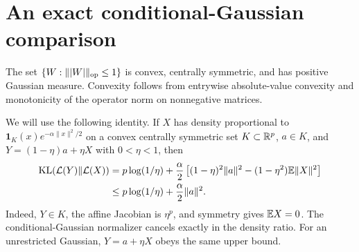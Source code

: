 \section{An exact conditional-Gaussian comparison}
The set $\{W:\||W|\|_{\mathrm{op}}\le1\}$ is convex, centrally symmetric, and has positive Gaussian measure. Convexity follows from entrywise absolute-value convexity and monotonicity of the operator norm on nonnegative matrices.

We will use the following identity. If $X$ has density proportional to $\mathbf1_K(x)e^{-\alpha\|x\|^2/2}$ on a convex centrally symmetric set $K\subset\mathbb R^p$, $a\in K$, and $Y=(1-\eta)a+\eta X$ with $0<\eta<1$, then
\begin{align}
 \operatorname{KL}(\mathcal L(Y)\|\mathcal L(X))
 &=p\log(1/\eta)+\frac\alpha2\left[(1-\eta)^2\|a\|^2-(1-\eta^2)\mathbb E\|X\|^2\right]\notag\\
 &\le p\log(1/\eta)+\frac\alpha2\|a\|^2.
 \label{eq:transport}
\end{align}
Indeed, $Y\in K$, the affine Jacobian is $\eta^p$, and symmetry gives $\mathbb E X=0$. The conditional-Gaussian normalizer cancels exactly in the density ratio. For an unrestricted Gaussian, $Y=a+\eta X$ obeys the same upper bound.

